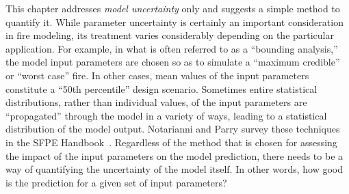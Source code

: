 This chapter addresses {\em model uncertainty} only and suggests a simple method to quantify it. While parameter uncertainty is certainly an
important consideration in fire modeling, its treatment varies considerably depending on the particular application. For example, in what is often
referred to as a ``bounding analysis,'' the model input parameters are chosen so as to simulate a ``maximum credible'' or ``worst case'' fire. In
other cases, mean values of the input parameters constitute a ``50th percentile'' design scenario. Sometimes entire statistical distributions, rather
than individual values, of the input parameters are ``propagated'' through the model in a variety of ways, leading to a statistical distribution of
the model output. Notarianni and Parry survey these techniques in the SFPE Handbook~\cite{Notarianni:SFPE}. Regardless of the method that is chosen
for assessing the impact of the input parameters on the model prediction, there needs to be a way of quantifying the uncertainty of the model itself.
In other words, how good is the prediction for a given set of input parameters?


